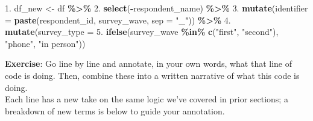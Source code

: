 \documentclass[
]{book}
\newenvironment{Shaded}{\begin{snugshade}}{\end{snugshade}}
\newcommand{\AttributeTok}[1]{\textcolor[rgb]{0.13,0.29,0.53}{#1}}
\newcommand{\FloatTok}[1]{\textcolor[rgb]{0.00,0.00,0.81}{#1}}
\newcommand{\FunctionTok}[1]{\textcolor[rgb]{0.13,0.29,0.53}{\textbf{#1}}}
\newcommand{\NormalTok}[1]{#1}
\newcommand{\OtherTok}[1]{\textcolor[rgb]{0.56,0.35,0.01}{#1}}
\newcommand{\SpecialCharTok}[1]{\textcolor[rgb]{0.81,0.36,0.00}{\textbf{#1}}}
\newcommand{\StringTok}[1]{\textcolor[rgb]{0.31,0.60,0.02}{#1}}
\begin{document}
\begin{Shaded}
\begin{Highlighting}[]
\FloatTok{1.}\NormalTok{  df\_new }\OtherTok{\textless{}{-}}\NormalTok{ df }\SpecialCharTok{\%\textgreater{}\%} 
\FloatTok{2.}    \FunctionTok{select}\NormalTok{(}\SpecialCharTok{{-}}\NormalTok{respondent\_name) }\SpecialCharTok{\%\textgreater{}\%} 
\FloatTok{3.}    \FunctionTok{mutate}\NormalTok{(}\AttributeTok{identifier =} \FunctionTok{paste}\NormalTok{(respondent\_id, survey\_wave, }\AttributeTok{sep =} \StringTok{"\_"}\NormalTok{)) }\SpecialCharTok{\%\textgreater{}\%} 
\FloatTok{4.}    \FunctionTok{mutate}\NormalTok{(}\AttributeTok{survey\_type =} 
\FloatTok{5.}           \FunctionTok{ifelse}\NormalTok{(survey\_wave }\SpecialCharTok{\%in\%} \FunctionTok{c}\NormalTok{(}\StringTok{"first"}\NormalTok{, }\StringTok{"second"}\NormalTok{), }\StringTok{"phone"}\NormalTok{, }\StringTok{"in person"}\NormalTok{))}
  
\end{Highlighting}
\end{Shaded}

\textbf{Exercise}: Go line by line and annotate, in your own words, what that line of code is doing. Then, combine these into a written narrative of what this code is doing.\\

Each line has a new take on the same logic we've covered in prior sections; a breakdown of new terms is below to guide your annotation.
\end{document}
